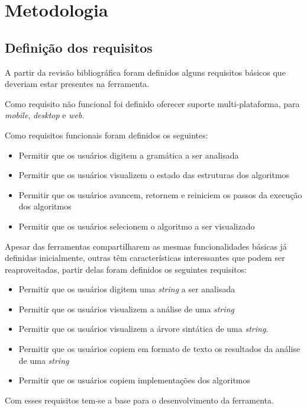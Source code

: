 \chapter{Metodologia}
\label{chap:metodologia}

\section{Definição dos requisitos}
A partir da revisão bibliográfica foram definidos alguns requisitos básicos que deveriam estar presentes na ferramenta. 

Como requisito não funcional foi definido oferecer suporte multi-plataforma, para \textit{mobile}, \textit{desktop} e \textit{web}. 

Como requisitos funcionais foram definidos os seguintes:
\begin{itemize}[label={$\sbullet$}]
    \item Permitir que os usuários digitem a gramática a ser analisada
    \item Permitir que os usuários visualizem o estado das estruturas dos algoritmos
    \item Permitir que os usuários avancem, retornem e reiniciem os passos da execução dos algoritmos  
    \item Permitir que os usuários selecionem o algoritmo a ser visualizado
\end{itemize}
 
Apesar das ferramentas compartilharem as mesmas funcionalidades básicas já definidas inicialmente, outras têm características interessantes que podem ser reaproveitadas, partir delas foram definidos os seguintes requisitos:
\begin{itemize}[label={$\sbullet$}]
    \item Permitir que os usuários digitem uma \textit{string} a ser analisada
    \item Permitir que os usuários visualizem a análise de uma \textit{string}
    \item Permitir que os usuários visualizem a árvore sintática de uma \textit{string}. 
    \item Permitir que os usuários copiem em formato de texto os resultados da análise de uma \textit{string}
    \item Permitir que os usuários copiem implementações dos algoritmos 
\end{itemize}
Com esses requisitos tem-se a base para o desenvolvimento da ferramenta.

